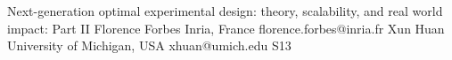 

\clearpage

\begin{session}
 {Next-generation optimal experimental design: theory, scalability, and real world impact: Part II}%
 {Florence Forbes}%
 {Inria, France}%
 {florence.forbes@inria.fr}%
 {Xun Huan}%
 {University of Michigan, USA}%
 {xhuan@umich.edu}%
 {S13}%
 {}%


\end{session}
